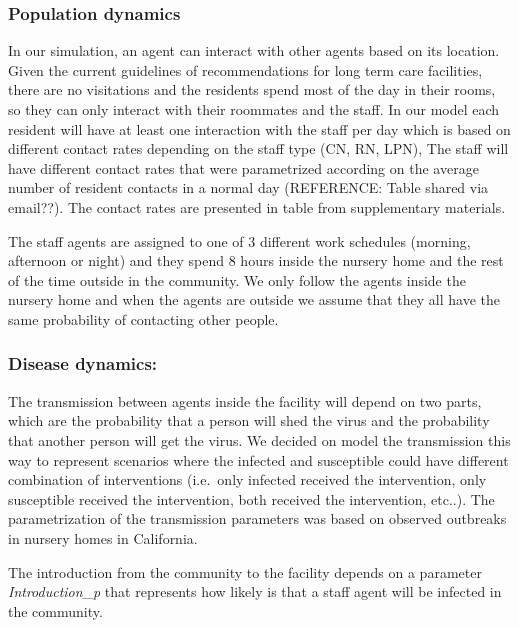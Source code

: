 \documentclass[
]{article}
\begin{document}
\hypertarget{population-dynamics}{%
\subsubsection{Population dynamics}\label{population-dynamics}}

In our simulation, an agent can interact with other agents based on its
location. Given the current guidelines of recommendations for long term
care facilities, there are no visitations and the residents spend most
of the day in their rooms, so they can only interact with their
roommates and the staff. In our model each resident will have at least
one interaction with the staff per day which is based on different
contact rates depending on the staff type (CN, RN, LPN), The staff will
have different contact rates that were parametrized according on the
average number of resident contacts in a normal day (REFERENCE: Table
shared via email??). The contact rates are presented in table from
supplementary materials.

The staff agents are assigned to one of 3 different work schedules
(morning, afternoon or night) and they spend 8 hours inside the nursery
home and the rest of the time outside in the community. We only follow
the agents inside the nursery home and when the agents are outside we
assume that they all have the same probability of contacting other
people.

\hypertarget{disease-dynamics}{%
\subsubsection{Disease dynamics:}\label{disease-dynamics}}

The transmission between agents inside the facility will depend on two
parts, which are the probability that a person will shed the virus and
the probability that another person will get the virus. We decided on
model the transmission this way to represent scenarios where the
infected and susceptible could have different combination of
interventions (i.e.~only infected received the intervention, only
susceptible received the intervention, both received the intervention,
etc..). The parametrization of the transmission parameters was based on
observed outbreaks in nursery homes in California.

The introduction from the community to the facility depends on a
parameter \emph{Introduction\_p} that represents how likely is that a
staff agent will be infected in the community.
\end{document}
